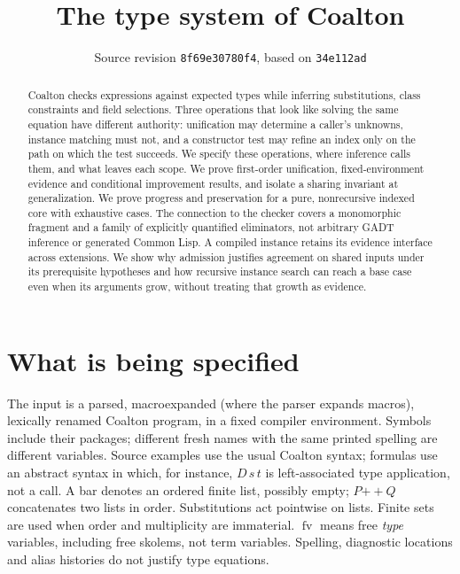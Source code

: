 \documentclass[11pt]{article}
\title{The type system of Coalton}
\author{}
\date{Source revision \texttt{8f69e30780f4}, based on \texttt{34e112ad}}
\theoremstyle{definition}
\newcommand{\fv}{\operatorname{fv}}
\begin{document}
\maketitle

{\centering
{}\par}

\begin{abstract}
Coalton checks expressions against expected types while inferring substitutions,
class constraints and field selections. Three operations that look like solving
the same equation have different authority: unification may determine a caller's
unknowns, instance matching must not, and a constructor test may refine an
index only on the path on which the test succeeds. We specify these operations,
where inference calls them, and what leaves each scope. We prove first-order
unification, fixed-environment evidence and conditional improvement results,
and isolate a sharing invariant at generalization. We prove progress and
preservation for a pure, nonrecursive indexed core with exhaustive cases.
The connection to the checker covers a monomorphic fragment and a family of
explicitly quantified eliminators, not arbitrary GADT inference or generated
Common Lisp. A compiled instance retains its evidence interface across
extensions. We show why admission justifies agreement on shared inputs
under its prerequisite hypotheses and how recursive instance search
can reach a base case even when its arguments grow, without treating
that growth as evidence.
\end{abstract}
\tableofcontents

\section{What is being specified}

The input is a parsed, macroexpanded (where the parser expands macros),
lexically renamed Coalton program, in a fixed compiler environment. Symbols
include their packages; different fresh names with the same printed spelling
are different variables. Source examples use the usual Coalton syntax;
formulas use an abstract syntax in which, for instance, $D\,s\,t$ is
left-associated type application, not a call. A bar denotes an ordered finite
list, possibly empty; $P\mathbin{+\!\!+}Q$ concatenates two lists in order.
Substitutions act pointwise on lists. Finite sets are used
when order and multiplicity are immaterial. $\fv$ means free \emph{type}
variables, including free skolems, not term variables. Spelling, diagnostic
locations and alias histories do not justify type equations.
\end{document}
